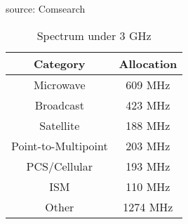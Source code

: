 
source: Comsearch~\cite{Comsearch}

\begin{table}[htp]
 \begin{center}\begin{tabular}[t]{|c|c|}
 \hline
Category &  Allocation \\
\hline

Microwave & 609 MHz  \\
\hline

Broadcast & 423 MHz\\
\hline

Satellite & 188 MHz  \\
\hline

Point-to-Multipoint & 203 MHz  \\
\hline

PCS/Cellular & 193 MHz   \\
\hline

ISM & 110 MHz    \\
\hline

Other & 1274 MHz   \\
\hline

\end{tabular}
\end{center}
  \caption{\footnotesize{Spectrum under 3 GHz}
   \label{table:categories}}
\end{table}
